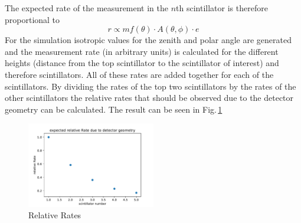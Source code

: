   The expected rate of the measurement in the $n$th scintillator is therefore proportional to
  \begin{equation}
    r\propto mf\left(\theta\right)\cdot A\left(\theta,\phi\right)\cdot e
  \end{equation}
  For the simulation isotropic values for the zenith and polar angle are generated and the measurement rate (in arbitrary units) is calculated for the different heights (distance from the top scintillator to the scintillator of interest) and therefore scintillators. All of these rates are added together for each of the scintillators. By dividing the rates of the top two scintillators by the rates of the other scintillators the relative rates that should be observed due to the detector geometry can be calculated. The result can be seen in Fig.\,\ref{f:relativeRates}
\begin{figure}[H]
    \centering
    \includegraphics[width=0.5\textwidth]{figures/relativeRate.pdf}
    \caption{Relative Rates}
    \label{f:relativeRates}
\end{figure}
